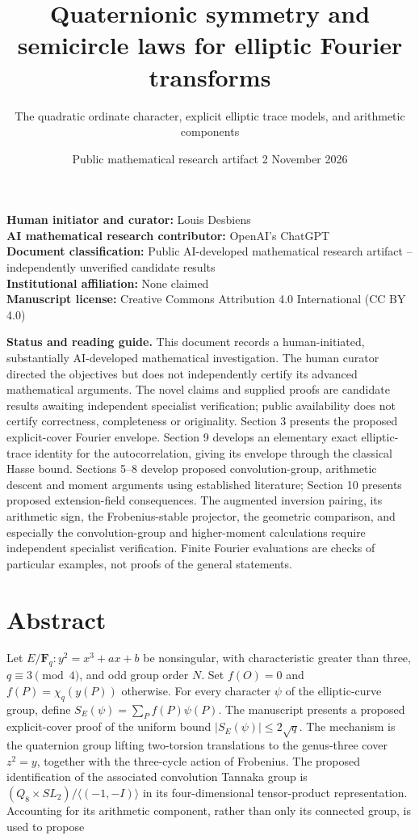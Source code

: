 \documentclass[
  11pt,
  a4paper,
]{article}
\title{Quaternionic symmetry and semicircle laws for elliptic Fourier transforms}
\subtitle{The quadratic ordinate character, explicit elliptic trace models, and arithmetic components}
\author{}
\date{Public mathematical research artifact \textbar{} 2 November 2026}
\begin{document}
\maketitle

\textbf{Human initiator and curator:} Louis Desbiens\\
\textbf{AI mathematical research contributor:} OpenAI's ChatGPT\\
\textbf{Document classification:} Public AI-developed mathematical
research artifact -- independently unverified candidate results\\
\textbf{Institutional affiliation:} None claimed\\
\textbf{Manuscript license:} Creative Commons Attribution 4.0 International (CC BY 4.0)

\textbf{Status and reading guide.} This document records a
human-initiated, substantially AI-developed mathematical investigation.
The human curator directed the objectives but does not independently
certify its advanced mathematical arguments. The novel claims and
supplied proofs are candidate results awaiting independent specialist
verification; public availability does not certify correctness,
completeness or originality. Section 3 presents the proposed explicit-cover Fourier envelope.
Section 9 develops an elementary exact elliptic-trace identity for the
autocorrelation, giving its envelope through the classical Hasse bound.
Sections 5--8 develop proposed convolution-group, arithmetic descent and
moment arguments using established literature; Section 10 presents
proposed extension-field consequences. The augmented inversion pairing, its
arithmetic sign, the Frobenius-stable projector, the geometric comparison,
and especially the convolution-group and higher-moment calculations
require independent specialist verification. Finite Fourier evaluations
are checks of particular examples, not proofs of the general statements.

\section{Abstract}\label{abstract}

Let \(E/\mathbf F_q:y^2=x^3+ax+b\) be nonsingular, with characteristic
greater than three, \(q\equiv3\pmod4\), and odd group order \(N\). Set
\(f(O)=0\) and \(f(P)=\chi_q(y(P))\) otherwise. For every character
\(\psi\) of the elliptic-curve group, define
\(S_E(\psi)=\sum_P f(P)\psi(P)\). The manuscript presents a proposed
explicit-cover proof of the uniform bound \(|S_E(\psi)|\leq2\sqrt q\).
The mechanism is the quaternion group lifting two-torsion translations
to the genus-three cover \(z^2=y\), together with the three-cycle action
of Frobenius. The proposed identification of the associated convolution
Tannaka group is \((Q_8\times SL_2)/\langle(-1,-I)\rangle\) in its
four-dimensional tensor-product representation. Accounting for its
arithmetic component, rather than only its connected group, is used to
propose
\end{document}
